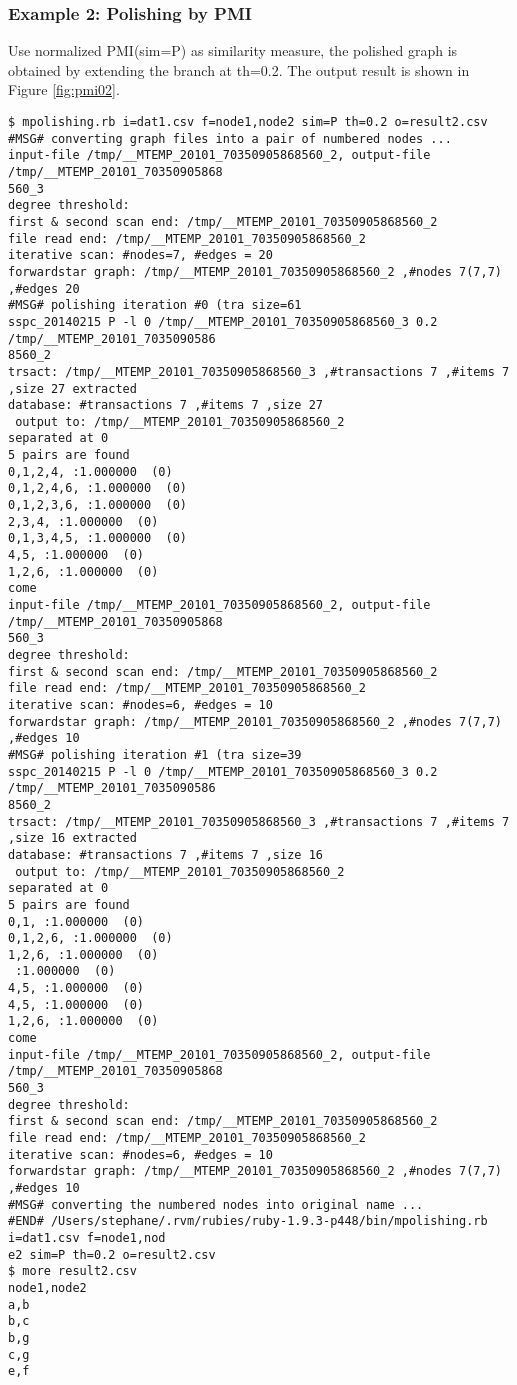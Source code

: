 \subsubsection*{Example 2: Polishing by PMI}

Use normalized PMI(sim=P) as similarity measure, the polished graph is obtained by extending the branch at th=0.2.
The output result is shown in Figure \ref{fig:pmi02}.



\begin{Verbatim}[baselinestretch=0.7,frame=single]
$ mpolishing.rb i=dat1.csv f=node1,node2 sim=P th=0.2 o=result2.csv
#MSG# converting graph files into a pair of numbered nodes ...
input-file /tmp/__MTEMP_20101_70350905868560_2, output-file /tmp/__MTEMP_20101_70350905868
560_3
degree threshold: 
first & second scan end: /tmp/__MTEMP_20101_70350905868560_2
file read end: /tmp/__MTEMP_20101_70350905868560_2
iterative scan: #nodes=7, #edges = 20
forwardstar graph: /tmp/__MTEMP_20101_70350905868560_2 ,#nodes 7(7,7) ,#edges 20
#MSG# polishing iteration #0 (tra size=61
sspc_20140215 P -l 0 /tmp/__MTEMP_20101_70350905868560_3 0.2 /tmp/__MTEMP_20101_7035090586
8560_2
trsact: /tmp/__MTEMP_20101_70350905868560_3 ,#transactions 7 ,#items 7 ,size 27 extracted 
database: #transactions 7 ,#items 7 ,size 27
 output to: /tmp/__MTEMP_20101_70350905868560_2
separated at 0
5 pairs are found
0,1,2,4, :1.000000  (0)
0,1,2,4,6, :1.000000  (0)
0,1,2,3,6, :1.000000  (0)
2,3,4, :1.000000  (0)
0,1,3,4,5, :1.000000  (0)
4,5, :1.000000  (0)
1,2,6, :1.000000  (0)
come
input-file /tmp/__MTEMP_20101_70350905868560_2, output-file /tmp/__MTEMP_20101_70350905868
560_3
degree threshold: 
first & second scan end: /tmp/__MTEMP_20101_70350905868560_2
file read end: /tmp/__MTEMP_20101_70350905868560_2
iterative scan: #nodes=6, #edges = 10
forwardstar graph: /tmp/__MTEMP_20101_70350905868560_2 ,#nodes 7(7,7) ,#edges 10
#MSG# polishing iteration #1 (tra size=39
sspc_20140215 P -l 0 /tmp/__MTEMP_20101_70350905868560_3 0.2 /tmp/__MTEMP_20101_7035090586
8560_2
trsact: /tmp/__MTEMP_20101_70350905868560_3 ,#transactions 7 ,#items 7 ,size 16 extracted 
database: #transactions 7 ,#items 7 ,size 16
 output to: /tmp/__MTEMP_20101_70350905868560_2
separated at 0
5 pairs are found
0,1, :1.000000  (0)
0,1,2,6, :1.000000  (0)
1,2,6, :1.000000  (0)
 :1.000000  (0)
4,5, :1.000000  (0)
4,5, :1.000000  (0)
1,2,6, :1.000000  (0)
come
input-file /tmp/__MTEMP_20101_70350905868560_2, output-file /tmp/__MTEMP_20101_70350905868
560_3
degree threshold: 
first & second scan end: /tmp/__MTEMP_20101_70350905868560_2
file read end: /tmp/__MTEMP_20101_70350905868560_2
iterative scan: #nodes=6, #edges = 10
forwardstar graph: /tmp/__MTEMP_20101_70350905868560_2 ,#nodes 7(7,7) ,#edges 10
#MSG# converting the numbered nodes into original name ...
#END# /Users/stephane/.rvm/rubies/ruby-1.9.3-p448/bin/mpolishing.rb i=dat1.csv f=node1,nod
e2 sim=P th=0.2 o=result2.csv
$ more result2.csv
node1,node2
a,b
b,c
b,g
c,g
e,f
\end{Verbatim}
